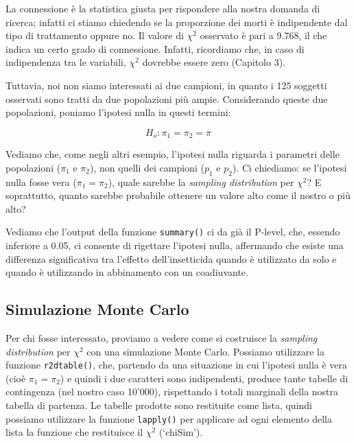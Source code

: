 \documentclass[a4paper,12pt,oneside]{book}
\begin{document}
La connessione è la statistica giusta per rispondere alla nostra domanda di ricerca; infatti ci stiamo chiedendo se la proporzione dei morti è indipendente dal tipo di trattamento oppure no. Il valore di \(\chi^2\) osservato è pari a 9.768, il che indica un certo grado di connessione. Infatti, ricordiamo che, in caso di indipendenza tra le variabili, \(\chi^2\) dovrebbe essere zero (Capitolo 3).

Tuttavia, noi non siamo interessati ai due campioni, in quanto i 125 soggetti osservati sono tratti da due popolazioni più ampie. Considerando queste due popolazioni, poniamo l'ipotesi nulla in questi termini:

\[H_o :\pi_1  = \pi_2  = \pi\]

Vediamo che, come negli altri esempio, l'ipotesi nulla riguarda i parametri delle popolazioni (\(\pi_1\) e \(\pi_2\)), non quelli dei campioni (\(p_1\) e \(p_2\)). Ci chiediamo: se l'ipotesi nulla fosse vera (\(\pi_1 = \pi_2\)), quale sarebbe la \emph{sampling distribution} per \(\chi^2\)? E soprattutto, quanto sarebbe probabile ottenere un valore alto come il nostro o più alto?

Vediamo che l'output della funzione \texttt{summary()} ci da già il P-level, che, essendo inferiore a 0.05, ci consente di rigettare l'ipotesi nulla, affermando che esiste una differenza significativa tra l'effetto dell'insetticida quando è utilizzato da solo e quando è utilizzando in abbinamento con un coadiuvante.

\hypertarget{simulazione-monte-carlo-1}{%
\subsection{Simulazione Monte Carlo}\label{simulazione-monte-carlo-1}}

Per chi fosse interessato, proviamo a vedere come si costruisce la \emph{sampling distribution} per \(\chi^2\) con una simulazione Monte Carlo. Possiamo utilizzare la funzione \texttt{r2dtable()}, che, partendo da una situazione in cui l'ipotesi nulla è vera (cioè \(\pi_1 = \pi_2\)) e quindi i due caratteri sono indipendenti, produce tante tabelle di contingenza (nel nostro caso 10'000), rispettando i totali marginali della nostra tabella di partenza. Le tabelle prodotte sono restituite come lista, quindi possiamo utilizzare la funzione \texttt{lapply()} per applicare ad ogni elemento della lista la funzione che restituisce il \(\chi^2\) (`chiSim').
\end{document}
